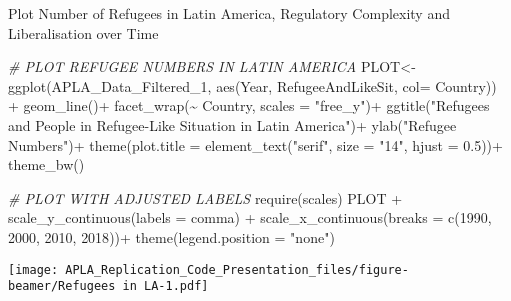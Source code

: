 \documentclass[
  ignorenonframetext,
]{beamer}
\newenvironment{Shaded}{\begin{snugshade}}{\end{snugshade}}
\newcommand{\AttributeTok}[1]{\textcolor[rgb]{0.77,0.63,0.00}{#1}}
\newcommand{\CommentTok}[1]{\textcolor[rgb]{0.56,0.35,0.01}{\textit{#1}}}
\newcommand{\DecValTok}[1]{\textcolor[rgb]{0.00,0.00,0.81}{#1}}
\newcommand{\FloatTok}[1]{\textcolor[rgb]{0.00,0.00,0.81}{#1}}
\newcommand{\FunctionTok}[1]{\textcolor[rgb]{0.00,0.00,0.00}{#1}}
\newcommand{\NormalTok}[1]{#1}
\newcommand{\OtherTok}[1]{\textcolor[rgb]{0.56,0.35,0.01}{#1}}
\newcommand{\SpecialCharTok}[1]{\textcolor[rgb]{0.00,0.00,0.00}{#1}}
\newcommand{\StringTok}[1]{\textcolor[rgb]{0.31,0.60,0.02}{#1}}
\begin{document}
\begin{frame}[fragile]{Plot Number of Refugees in Latin America,
Regulatory Complexity and Liberalisation over Time}
\begin{Shaded}
\begin{Highlighting}[]
\CommentTok{\# PLOT REFUGEE NUMBERS IN LATIN AMERICA}
\NormalTok{PLOT}\OtherTok{\textless{}{-}} \FunctionTok{ggplot}\NormalTok{(APLA\_Data\_Filtered\_1, }\FunctionTok{aes}\NormalTok{(Year, RefugeeAndLikeSit, }\AttributeTok{col=}\NormalTok{ Country)) }\SpecialCharTok{+}
  \FunctionTok{geom\_line}\NormalTok{()}\SpecialCharTok{+}
  \FunctionTok{facet\_wrap}\NormalTok{(}\SpecialCharTok{\textasciitilde{}}\NormalTok{ Country, }\AttributeTok{scales =} \StringTok{"free\_y"}\NormalTok{)}\SpecialCharTok{+}
  \FunctionTok{ggtitle}\NormalTok{(}\StringTok{"Refugees and People in Refugee{-}Like Situation in Latin America"}\NormalTok{)}\SpecialCharTok{+}
  \FunctionTok{ylab}\NormalTok{(}\StringTok{"Refugee Numbers"}\NormalTok{)}\SpecialCharTok{+}
  \FunctionTok{theme}\NormalTok{(}\AttributeTok{plot.title =} \FunctionTok{element\_text}\NormalTok{(}\StringTok{"serif"}\NormalTok{, }\AttributeTok{size =} \StringTok{"14"}\NormalTok{, }\AttributeTok{hjust =} \FloatTok{0.5}\NormalTok{))}\SpecialCharTok{+}
  \FunctionTok{theme\_bw}\NormalTok{()}

\CommentTok{\# PLOT WITH ADJUSTED LABELS}
\FunctionTok{require}\NormalTok{(scales)}
\NormalTok{PLOT }\SpecialCharTok{+} \FunctionTok{scale\_y\_continuous}\NormalTok{(}\AttributeTok{labels =}\NormalTok{ comma) }\SpecialCharTok{+} 
    \FunctionTok{scale\_x\_continuous}\NormalTok{(}\AttributeTok{breaks =} \FunctionTok{c}\NormalTok{(}\DecValTok{1990}\NormalTok{, }\DecValTok{2000}\NormalTok{, }\DecValTok{2010}\NormalTok{, }\DecValTok{2018}\NormalTok{))}\SpecialCharTok{+}
    \FunctionTok{theme}\NormalTok{(}\AttributeTok{legend.position =} \StringTok{"none"}\NormalTok{)}
\end{Highlighting}
\end{Shaded}

\texttt{[image: APLA\_Replication\_Code\_Presentation\_files/figure-beamer/Refugees in LA-1.pdf]}


\end{frame}
\end{document}
